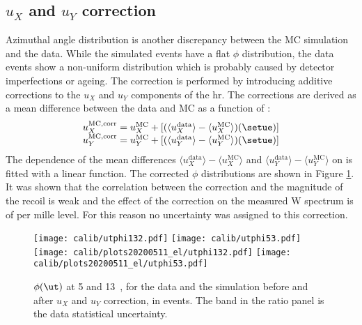     \subsection{$u_X$ and $u_Y$ correction}
     Azimuthal angle distribution is another discrepancy between the MC simulation and the data. While the simulated events have a flat $\phi$ distribution, the data events show a non-uniform distribution which is probably caused by detector imperfections or ageing. The correction is performed by introducing additive corrections to the $u_X$ and $u_Y$ components of the \gls{hr}. The corrections are derived as a mean difference between the data and MC as a function of \setue:
     \begin{equation}
     \begin{array}{c}
     u_X^{\mathrm{MC, corr}} = u_X^{\mathrm{MC}} + [(\langle{u_X^{\mathrm{data}}}\rangle-\langle{u_X^{\mathrm{MC}}}\rangle)(\setue)] \\
     u_Y^{\mathrm{MC, corr}} = u_Y^{\mathrm{MC}} + [(\langle{u_Y^{\mathrm{data}}}\rangle-\langle{u_Y^{\mathrm{MC}}}\rangle)(\setue)]
     \end{array}
     \end{equation}
     The dependence of the mean differences $\langle{u_X^{\mathrm{data}}}\rangle-\langle{u_X^{\mathrm{MC}}}\rangle$ and $\langle{u_Y^{\mathrm{data}}}\rangle-\langle{u_Y^{\mathrm{MC}}}\rangle$ on \setue is fitted with a linear function. The corrected $\phi$ distributions are shown in Figure \ref{fig:utphicorr}. It was shown that the correlation between the correction and the magnitude of the recoil is weak and the effect of the correction on the measured W spectrum is of per mille level. For this reason no uncertainty was assigned to this correction.
     
     \begin{figure}
     		\texttt{[image: calib/utphi132.pdf]}
     		\texttt{[image: calib/utphi53.pdf]}
     		\texttt{[image: calib/plots20200511\_el/utphi132.pdf]}
     		\texttt{[image: calib/plots20200511\_el/utphi53.pdf]}
     	\caption{$\phi(\ut)$ at 5 and 13~\TeV, for the data and the simulation before and after $u_X$ and $u_Y$ correction, in \Zboson events. The band in the ratio panel is the data statistical uncertainty.}
     	\label{fig:utphicorr}
     \end{figure}
     
